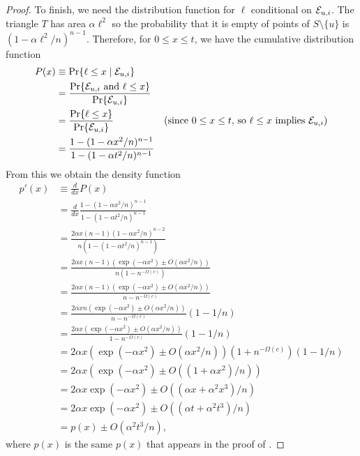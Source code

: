 \documentclass{patmorin}
\begin{document}
\begin{proof}
To finish, we need the distribution function for $\ell$ conditional on
$\mathcal{E}_{u,i}$.  The triangle $T$ has area $\alpha\ell^2$ so the probability that
it is empty of points of $S\setminus\{u\}$ is $(1-\alpha\ell^2/n)^{n-1}$.
Therefore, for $0\le x\le t$, we have the cumulative distribution function
\begin{align*}
   P(x) & \equiv \Pr\{\ell \le x\mid \mathcal{E}_{u,i}\}  \\
      & = \frac{\Pr\{\mathcal{E}_{u,i}\mbox{ and }\ell\le x\}}
               {\Pr\{\mathcal{E}_{u,i}\}} \\
      & = \frac{\Pr\{\ell\le x\}}  
               {\Pr\{\mathcal{E}_{u,i}\}} & \text{(since $0\le x\le t$, so $\ell \le x$ implies $\mathcal{E}_{u,i}$)} \\
      & = \frac{1-(1-\alpha x^2/n)^{n-1}}{1-(1-\alpha t^2/n)^{n-1}} 
\end{align*}
From this we obtain the density function
\begin{align*}
  p'(x) & \equiv \frac{d}{dx}P(x) \\
        & = \frac{d}{dx}
             \frac{1-(1-\alpha x^2/n)^{n-1}}{1-(1-\alpha t^2/n)^{n-1}} \\
        & = \frac{2\alpha x(n-1)(1-\alpha x^2/n)^{n-2}}
                  {n(1-(1-\alpha t^2/n)^{n-1})} \\
        & = \frac{2\alpha x(n-1)(\exp(-\alpha x^2)\pm O(\alpha x^2/n))}
                  {n(1-n^{-\Omega(c)})} \\
        & = \frac{2\alpha x(n-1)(\exp(-\alpha x^2)\pm O(\alpha x^2/n))}
                  {n-n^{-\Omega(c)}} \\
        & = \frac{2\alpha xn(\exp(-\alpha x^2)\pm O(\alpha x^2/n))}
                  {n-n^{-\Omega(c)}}(1-1/n) \\
        & = \frac{2\alpha x(\exp(-\alpha x^2)\pm O(\alpha x^2/n))}
                  {1-n^{-\Omega(c)}}(1-1/n) \\
        & = 2\alpha x\left(\exp(-\alpha x^2)\pm O(\alpha x^2/n)\right)
                  (1+n^{-\Omega(c)})(1-1/n) \\
        & = 2\alpha x\left(\exp(-\alpha x^2)\pm O((1+\alpha x^2)/n)\right) \\
        & = 2\alpha x\exp(-\alpha x^2)\pm O((\alpha x+\alpha^2 x^3)/n) \\
        & = 2\alpha x\exp(-\alpha x^2)\pm O((\alpha t + \alpha^2 t^3)/n) \\
        & = p(x)\pm O(\alpha^2 t^3/n) ,
\end{align*}
where $p(x)$ is the same $p(x)$ that appears in the proof of .

\end{proof}
\end{document}
